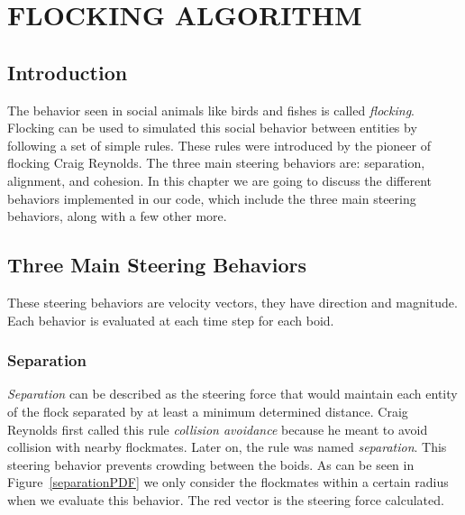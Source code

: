 \chapter{FLOCKING ALGORITHM}

\section{Introduction}
The behavior seen in social animals like birds and fishes is called \textit{flocking}. Flocking can be used to simulated this social behavior between entities by following a set of simple rules. These rules were introduced by the pioneer of flocking Craig Reynolds\cite{craig1}. The three main steering behaviors are: separation, alignment, and cohesion. In this chapter we are going to discuss the different behaviors implemented in our code, which include the three main steering behaviors, along with a few other more.

\section{Three Main Steering Behaviors}
These steering behaviors are velocity vectors, they have direction and magnitude. Each behavior is evaluated at each time step for each boid.

\subsection{Separation}
\textit{Separation} can be described as the steering force that would maintain each entity of the flock separated by at least a minimum determined distance. Craig Reynolds first called this rule \textit{collision avoidance} because he meant to avoid collision with nearby flockmates. Later on, the rule was named \textit{separation}. This steering behavior prevents crowding between the boids. As can be seen in Figure~\ref{separationPDF} we only consider the flockmates within a certain radius when we evaluate this behavior. The red vector is the steering force calculated.

